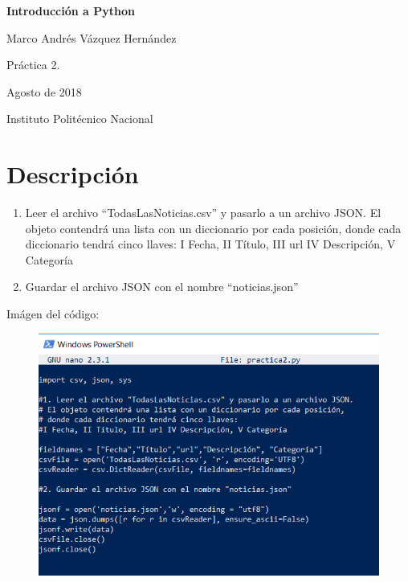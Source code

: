 \documentclass[]{article}
\title{}
\author{}
\date{}
\begin{document}
\begin{centering}

\vspace*{5 cm}

\Huge

{\bf Introducción a Python}

\vspace{3 cm}

\Large
Marco Andrés Vázquez Hernández

\vspace{1 cm}
\normalsize
Práctica 2. 

Agosto de 2018

\normalsize
Instituto Politécnico Nacional


\end{centering}

\newpage

\section{Descripción}\label{descripcion}

\begin{enumerate}
\def\labelenumi{\arabic{enumi}.}
\item
  Leer el archivo ``TodasLasNoticias.csv'' y pasarlo a un archivo JSON.
  El objeto contendrá una lista con un diccionario por cada posición,
  donde cada diccionario tendrá cinco llaves: I Fecha, II Título, III
  url IV Descripción, V Categoría
\item
  Guardar el archivo JSON con el nombre ``noticias.json''
\end{enumerate}

Imágen del código:

\begin{figure}[htbp]
\centering
\includegraphics{practica2py.png}
\end{figure}
\end{document}

